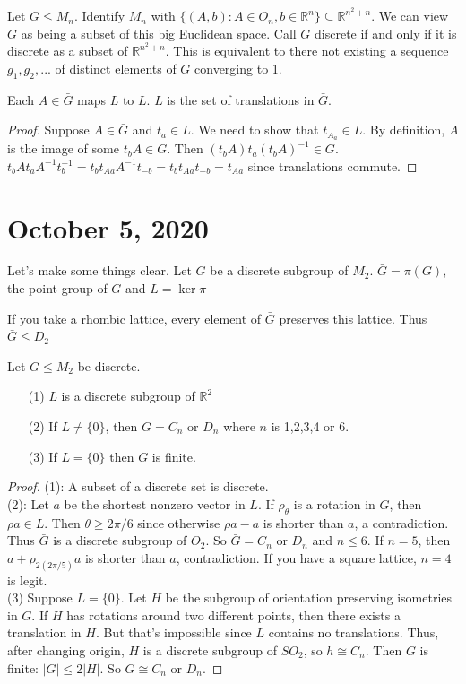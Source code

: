 \documentclass{article}
\newcommand{\R}{\mathbb{R}}
\begin{document}
\begin{definition}
Let $G\leq M_n$. Identify $M_n$ with $\{(A,b):A\in O_n, b\in\R^n\}\subseteq\R^{n^2+n}$. We can view $G$ as being a subset of this big Euclidean space. Call $G$ discrete if and only if it is discrete as a subset of $\R^{n^2+n}$. This is equivalent to there not existing a sequence $g_1,g_2,...$ of distinct elements of $G$ converging to 1. 
\end{definition}
\begin{proposition}
Each $A\in\bar{G}$ maps $L$ to $L$. $L$ is the set of translations in $\bar{G}$. 
\end{proposition}
\begin{proof}
Suppose $A\in\bar{G}$ and $t_a\in L$. We need to show that $t_{A_a}\in L$. By definition, $A$ is the image of some $t_bA\in G$. Then $(t_bA)t_a(t_bA)^{-1}\in G$. $t_bAt_aA^{-1}t^{-1}_b=t_bt_{Aa}A^{-1}t_{-b}=t_bt_{Aa}t_{-b}=t_{Aa}$ since translations commute. 
\end{proof}
\section{October 5, 2020}
Let's make some things clear. Let $G$ be a discrete subgroup of $M_2$. $\bar{G}=\pi(G)$, the point group of $G$ and $L=\ker\pi$
\begin{example}
If you take a rhombic lattice, every element of $\bar{G}$ preserves this lattice. Thus $\bar{G}\leq D_2$
\end{example}
\begin{theorem}
Let $G\leq M_2$ be discrete.
\begin{enumerate}
    \item[(1)] $L$ is a discrete subgroup of $\R^2$
    \item[(2)] If $L\neq \{0\}$, then $\bar{G}=C_n$ or $D_n$ where $n$ is 1,2,3,4 or 6. 
    \item[(3)] If $L=\{0\}$ then $G$ is finite.
\end{enumerate}
\end{theorem}
\begin{proof}
(1): A subset of a discrete set is discrete. \\
(2): Let $a$ be the shortest nonzero vector in $L$. If $\rho_\theta$ is a rotation in $\bar{G}$, then $\rho a\in L$. Then $\theta\geq 2\pi/6$ since otherwise $\rho a-a$ is shorter than $a$, a contradiction. Thus $\bar{G}$ is a discrete subgroup of $O_2$. So $\bar{G}=C_n$ or $D_n$ and $n\leq 6$. If $n=5$, then $a+\rho_{2(2\pi/5)}a$ is shorter than $a$, contradiction. If you have a square lattice, $n=4$ is legit. \\
(3) Suppose $L=\{0\}$. Let $H$ be the subgroup of orientation preserving isometries in $G$. If $H$ has rotations around two different points, then there exists a translation in $H$. But that's impossible since $L$ contains no translations. Thus, after changing origin, $H$ is a discrete subgroup of $SO_2$, so $h\cong C_n$. Then $G$ is finite: $|G|\leq 2|H|$. So $G\cong C_n$ or $D_n$. 
\end{proof}
\end{document}

